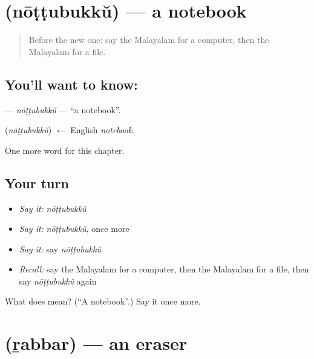 \section[\texorpdfstring{\ml{നോട്ടുബുക്ക്} (nōṭṭubukkŭ)}{നോട്ടുബുക്ക് (nōṭṭubukkŭ)}]{ (nōṭṭubukkŭ) — a notebook}

\label{lesson:ML-C251-nottubukku}



\begin{quote}
Before the new one: say the Malayalam for a computer, then the Malayalam for a file.
\end{quote}

\subsection*{You'll want to know: }
\textbf{} — \emph{nōṭṭubukkŭ} — \textquotedblleft{}a notebook\textquotedblright{}.

\begin{cousinweb}
\textbf{} (\emph{nōṭṭubukkŭ}) $\leftarrow$ English \emph{notebook}.
\end{cousinweb}

\begin{grammarlens}[title={What you've built}]
One more word for this chapter.
\end{grammarlens}

\subsection*{Your turn}
\begin{itemize}
\raggedright
  \item \emph{Say it:} \emph{nōṭṭubukkŭ}
  \item \emph{Say it:} \emph{nōṭṭubukkŭ}, once more
  \item \emph{Say it:} say \emph{nōṭṭubukkŭ}
  \item \emph{Recall:} say the Malayalam for a computer, then the Malayalam for a file, then say \emph{nōṭṭubukkŭ} again
\end{itemize}

\begin{tcolorbox}[breakable,colback=teal!4,colframe=teal!35!black,title={Before you move on}]
What does  mean? (\textquotedblleft{}A notebook\textquotedblright{}.) Say it once more.
\end{tcolorbox}
\section[\texorpdfstring{\ml{റബ്ബർ} (ṟabbar)}{റബ്ബർ (ṟabbar)}]{ (ṟabbar) — an eraser}

